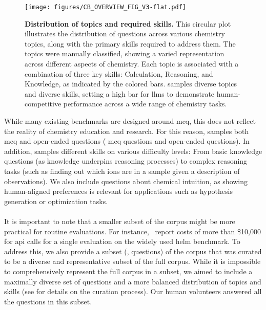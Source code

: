 \documentclass[11pt, oneside]{article}
\begin{document}
\begin{refsection}
\begin{figure}[!htb]
    \centering
    \texttt{[image: figures/CB\_OVERVIEW\_FIG\_V3-flat.pdf]}
    \caption{\textbf{Distribution of topics and required skills.} This circular plot illustrates the distribution of questions across various chemistry topics, along with the primary skills required to address them. The topics were manually classified, showing a varied representation across different aspects of chemistry. Each topic is associated with a combination of three key skills: Calculation, Reasoning, and Knowledge, as indicated by the colored bars. \chembench samples diverse topics and diverse skills, setting a high bar for \glspl{llm} to demonstrate human-competitive performance across a wide range of chemistry tasks.}
    \label{fig:corpus}
\end{figure}


While many existing benchmarks are designed around \gls{mcq}, this does not reflect the reality of chemistry education and research.
For this reason, \chembench samples both \gls{mcq} and open-ended questions ( \gls{mcq} questions and  open-ended questions). In addition, \chembench samples different skills on various difficulty levels: From basic knowledge questions (as knowledge underpins reasoning processes\autocite{hu2024towards,bloom1956taxonomy}) to complex reasoning tasks (such as finding out which ions are in a sample given a description of observations). We also include questions about chemical intuition, as showing human-aligned preferences is relevant for applications such as hypothesis generation or optimization tasks.\autocite{zhang2024omniopenendednessmodelshuman}


\paragraph{\chembenchmini}
It is important to note that a smaller subset of the corpus might be more practical for routine evaluations.\autocite{polo2024tinybenchmarks}
For instance,~\textcite{liang2023holistic} report costs of more than \$10,000 for \gls{api} calls for a single evaluation on the widely used \gls{helm} benchmark.
To address this, we also provide a subset (\chembenchmini,  questions) of the corpus that was curated to be a diverse and representative subset of the full corpus. While it is impossible to comprehensively represent the full corpus in a subset, we aimed to include a maximally diverse set of questions and a more balanced distribution of topics and skills (see  for details on the curation process).
Our human volunteers answered all the questions in this subset.




\end{refsection}
\end{document}
